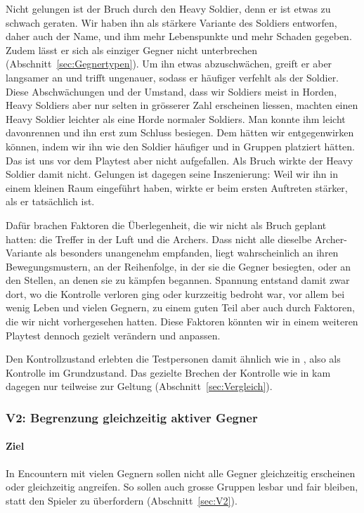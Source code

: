 \documentclass[../Main.tex]{subfiles}
\begin{document}
Nicht gelungen ist der Bruch durch den Heavy Soldier, denn er ist etwas zu schwach geraten. Wir haben ihn als stärkere Variante des Soldiers entworfen, daher auch der Name, und ihm mehr Lebenspunkte und mehr Schaden gegeben. Zudem lässt er sich als einziger Gegner nicht unterbrechen (Abschnitt~\ref{sec:Gegnertypen}). Um ihn etwas abzuschwächen, greift er aber langsamer an und trifft ungenauer, sodass er häufiger verfehlt als der Soldier. Diese Abschwächungen und der Umstand, dass wir Soldiers meist in Horden, Heavy Soldiers aber nur selten in grösserer Zahl erscheinen liessen, machten einen Heavy Soldier leichter als eine Horde normaler Soldiers. Man konnte ihm leicht davonrennen und ihn erst zum Schluss besiegen. Dem hätten wir entgegenwirken können, indem wir ihn wie den Soldier häufiger und in Gruppen platziert hätten. Das ist uns vor dem Playtest aber nicht aufgefallen. Als Bruch wirkte der Heavy Soldier damit nicht. Gelungen ist dagegen seine Inszenierung: Weil wir ihn in einem kleinen Raum eingeführt haben, wirkte er beim ersten Auftreten stärker, als er tatsächlich ist.

Dafür brachen Faktoren die Überlegenheit, die wir nicht als Bruch geplant hatten: die Treffer in der Luft und die Archers. Dass nicht alle dieselbe Archer-Variante als besonders unangenehm empfanden, liegt wahrscheinlich an ihren Bewegungsmustern, an der Reihenfolge, in der sie die Gegner besiegten, oder an den Stellen, an denen sie zu kämpfen begannen. Spannung entstand damit zwar dort, wo die Kontrolle verloren ging oder kurzzeitig bedroht war, vor allem bei wenig Leben und vielen Gegnern, zu einem guten Teil aber auch durch Faktoren, die wir nicht vorhergesehen hatten. Diese Faktoren könnten wir in einem weiteren Playtest dennoch gezielt verändern und anpassen.

Den Kontrollzustand erlebten die Testpersonen damit ähnlich wie in , also als Kontrolle im Grundzustand. Das gezielte Brechen der Kontrolle wie in  kam dagegen nur teilweise zur Geltung (Abschnitt~\ref{sec:Vergleich}).


\subsubsection{V2: Begrenzung gleichzeitig aktiver Gegner}

\paragraph{Ziel}
In Encountern mit vielen Gegnern sollen nicht alle Gegner gleichzeitig erscheinen oder gleichzeitig angreifen. So sollen auch grosse Gruppen lesbar und fair bleiben, statt den Spieler zu überfordern (Abschnitt~\ref{sec:V2}).
\end{document}
